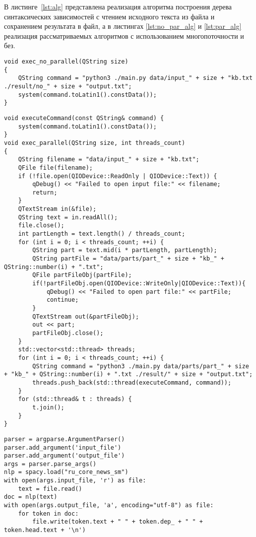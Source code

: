 В листинге~\ref{lst:alg} представлена реализация алгоритма построения дерева синтаксических зависимостей с чтением исходного текста из файла и сохранением результата в файл, а в листингах \ref{lst:no_par_alg} и \ref{lst:par_alg} реализация рассматриваемых алгоритмов с использованием многопоточности и без.
\begin{center}
	\captionsetup{justification=raggedright,singlelinecheck=off}
	\begin{lstlisting}[label=lst:no_par_alg,caption=Алгоритм построения дерева синтаксических зависимостей без многопоточности]
void exec_no_parallel(QString size)
{
	QString command = "python3 ./main.py data/input_" + size + "kb.txt ./result/no_" + size + "output.txt";	
	system(command.toLatin1().constData());
}
	\end{lstlisting}
\end{center}
\begin{center}
    \captionsetup{justification=raggedright,singlelinecheck=off}
    \begin{lstlisting}[label=lst:par_alg,caption=Алгоритм построения дерева синтаксических зависимостей с многопоточностью]
void executeCommand(const QString& command) {
	system(command.toLatin1().constData());
}
void exec_parallel(QString size, int threads_count)
{
	QString filename = "data/input_" + size + "kb.txt";
	QFile file(filename);
	if (!file.open(QIODevice::ReadOnly | QIODevice::Text)) {
		qDebug() << "Failed to open input file:" << filename;
		return;
	}
	QTextStream in(&file);
	QString text = in.readAll();
	file.close();
	int partLength = text.length() / threads_count;
	for (int i = 0; i < threads_count; ++i) {
		QString part = text.mid(i * partLength, partLength);
		QString partFile = "data/parts/part_" + size + "kb_" + QString::number(i) + ".txt";
		QFile partFileObj(partFile);
		if(!partFileObj.open(QIODevice::WriteOnly|QIODevice::Text)){
			qDebug() << "Failed to open part file:" << partFile;
			continue;
		}
		QTextStream out(&partFileObj);
		out << part;
		partFileObj.close();
	}
	std::vector<std::thread> threads;
	for (int i = 0; i < threads_count; ++i) {
		QString command = "python3 ./main.py data/parts/part_" + size + "kb_" + QString::number(i) + ".txt ./result/" + size + "output.txt";
		threads.push_back(std::thread(executeCommand, command));
	}
	for (std::thread& t : threads) {
		t.join();
	}
}
\end{lstlisting}
\end{center}

\begin{center}
	\captionsetup{justification=raggedright,singlelinecheck=off}
	\begin{lstlisting}[label=lst:alg,caption=Алгоритм построения дерева синтаксических зависимостей с помощью библиотеки spacy]
parser = argparse.ArgumentParser()
parser.add_argument('input_file')
parser.add_argument('output_file')
args = parser.parse_args()
nlp = spacy.load("ru_core_news_sm")
with open(args.input_file, 'r') as file:
	text = file.read()
doc = nlp(text)
with open(args.output_file, 'a', encoding="utf-8") as file:
	for token in doc:
		file.write(token.text + " " + token.dep_ + " " + token.head.text + '\n')
	\end{lstlisting}
\end{center}

